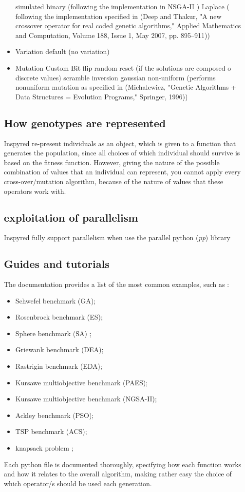 \documentclass{article}
\begin{document}
\begin{itemize}
            \subitem simulated binary (following the implementation in NSGA-II )
            \subitem Laplace ( following the implementation specified in (Deep and Thakur, "A new crossover operator for real coded genetic algorithms," Applied Mathematics and Computation, Volume 188, Issue 1, May 2007, pp. 895--911))
            \item Variation
                \subitem default (no variation)
            \item Mutation 
            \subitem Custom
            \subitem Bit flip
            \subitem random reset (if the solutions are composed o discrete values)
            \subitem scramble
            \subitem inversion
            \subitem gaussian
            \subitem non-uniform (performs nonuniform mutation as specified in (Michalewicz, "Genetic Algorithms
            + Data Structures = Evolution Programs," Springer, 1996))
        
        \end{itemize}
\subsection{How genotypes are represented}
Inspyred re-present individuals as an object, which is given to a function that generates the population, since all choices of which individual should survive is based on the fitness function. 
However, giving the nature of the possible combination of values that an individual can represent, you cannot apply every cross-over/mutation algorithm, because of the nature of values that these operators work with.
\subsection{exploitation of parallelism}
    Inspyred fully support parallelism when use the parallel python (\textit{pp}) library
\subsection{Guides and tutorials}
 The documentation provides a list of the most common examples, such as : 
 \begin{itemize}
     \item Schwefel benchmark (GA);
     \item Rosenbrock benchmark (ES);
    \item  Sphere benchmark (SA) ;
    \item Griewank benchmark (DEA);
    \item Rastrigin benchmark (EDA);
    \item Kursawe multiobjective benchmark (PAES);
    \item Kursawe multiobjective benchmark (NGSA-II);
    \item Ackley benchmark (PSO);
    \item TSP benchmark (ACS);
    \item knapsack problem ;
     \end{itemize}
    Each python file is documented thoroughly, specifying how each function works and how it relates to the overall algorithm, making rather easy the choice of which operator/s should be used each generation. 
\end{document}
